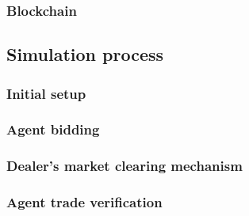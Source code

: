 \begin{comment}
    
\end{comment}


\subsubsection{Blockchain}

\subsection{Simulation process}

\subsubsection{Initial setup}

\subsubsection{Agent bidding}

\subsubsection{Dealer's market clearing mechanism}

\subsubsection{Agent trade verification}